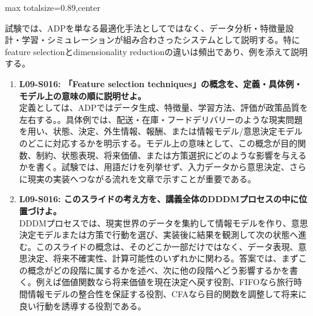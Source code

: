 \begin{minipage}[t]{0.58\textwidth}
\begin{adjustbox}{max totalsize={\textwidth}{0.89\textheight},center}
\begin{minipage}{\textwidth}
試験では、ADPを単なる最適化手法としてではなく、データ分析・特徴量設計・学習・シミュレーションが組み合わさったシステムとして説明する。特にfeature selectionとdimensionality reductionの違いは頻出であり、例を添えて説明する。\par{}\begin{enumerate}\item \textbf{L09-S016: 「Feature selection techniques」の概念を、定義・具体例・モデル上の意味の順に説明せよ。}\\定義としては、ADPではデータ生成、特徴量、学習方法、評価が政策品質を左右する。。具体例では、配送・在庫・フードデリバリーのような現実問題を用い、状態、決定、外生情報、報酬、または情報モデル/意思決定モデルのどこに対応するかを明示する。モデル上の意味として、この概念が目的関数、制約、状態表現、将来価値、または方策選択にどのような影響を与えるかを書く。試験では、用語だけを列挙せず、入力データから意思決定、さらに現実の実装へつながる流れを文章で示すことが重要である。\item \textbf{L09-S016: このスライドの考え方を、講義全体のDDDMプロセスの中に位置づけよ。}\\DDDMプロセスでは、現実世界のデータを集約して情報モデルを作り、意思決定モデルまたは方策で行動を選び、実装後に結果を観測して次の状態へ進む。このスライドの概念は、そのどこか一部だけではなく、データ表現、意思決定、将来不確実性、計算可能性のいずれかに関わる。答案では、まずこの概念がどの段階に属するかを述べ、次に他の段階へどう影響するかを書く。例えば価値関数なら将来価値を現在決定へ戻す役割、FIFOなら旅行時間情報モデルの整合性を保証する役割、CFAなら目的関数を調整して将来に良い行動を誘導する役割である。\end{enumerate}
\end{minipage}
\end{adjustbox}
\end{minipage}


